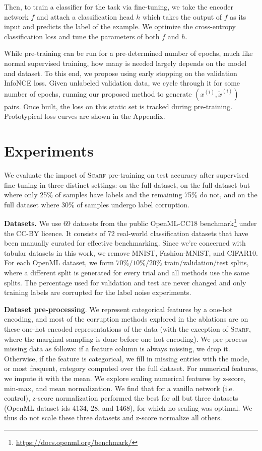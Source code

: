 Then, to train a classifier for the task via fine-tuning, we take the encoder network $f$ and attach a classification head $h$ which takes the output of $f$ as its input and predicts the label of the example. We optimize the cross-entropy classification loss and tune the parameters of both $f$ and $h$.

While pre-training can be run for a pre-determined number of epochs, much like normal supervised training, how many is needed largely depends on the model and dataset. To this end, we propose using early stopping on the validation InfoNCE loss. Given unlabeled validation data, we cycle through it for some number of epochs, running our proposed method to generate $\left(x^{(i)}, \tilde{x}^{(i)}\right)$ pairs. Once built, the loss on this static set is tracked during pre-training. Prototypical loss curves are shown in the Appendix.

\section{Experiments}
We evaluate the impact of \textsc{Scarf} pre-training on test accuracy after supervised fine-tuning in three distinct settings: on the full dataset, on the full dataset but where only 25\% of samples have labels and the remaining 75\% do not, and on the full dataset where 30\% of samples undergo label corruption.

{\bf Datasets.} We use 69 datasets from the public OpenML-CC18 benchmark\footnote{\url{https://docs.openml.org/benchmark/}} under the CC-BY licence. It consists of 72 real-world classification datasets that have been manually curated for effective benchmarking. Since we're concerned with tabular datasets in this work, we remove MNIST, Fashion-MNIST, and CIFAR10. For each OpenML dataset, we form $70\%/10\%/20\%$ train/validation/test splits, where a different split is generated for every trial and all methods use the same splits. The percentage used for validation and test are never changed and only training labels are corrupted for the label noise experiments.

{\bf Dataset pre-processing}. We represent categorical features by a one-hot encoding, and most of the corruption methods explored in the ablations are on these one-hot encoded representations of the data (with the exception of \textsc{Scarf}, where the marginal sampling is done before one-hot encoding). We pre-process missing data as follows: if a feature column is always missing, we drop it. Otherwise, if the feature is categorical, we fill in missing entries with the mode, or most frequent, category computed over the full dataset. For numerical features, we impute it with the mean. We explore scaling numerical features by z-score, min-max, and mean normalization. We find that for a vanilla network (i.e. control), z-score normalization performed the best for all but three datasets (OpenML dataset ids 4134, 28, and 1468), for which no scaling was optimal. We thus do not scale these three datasets and z-score normalize all others.

